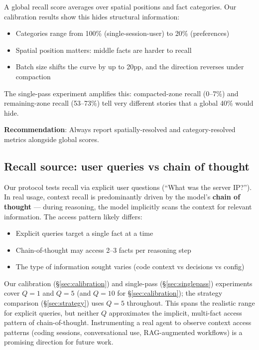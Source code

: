 A global recall score averages over spatial positions and fact categories. Our
calibration results show this hides structural information:
\begin{itemize}
  \item Categories range from 100\% (single-session-user) to 20\% (preferences)
  \item Spatial position matters: middle facts are harder to recall
  \item Batch size shifts the curve by up to 20pp, and the direction reverses under compaction
\end{itemize}

The single-pass experiment amplifies this: compacted-zone recall (0--7\%) and remaining-zone recall
(53--73\%) tell very different stories that a global 40\% would hide.

\textbf{Recommendation}: Always report spatially-resolved and category-resolved
metrics alongside global scores.

\subsection{Recall source: user queries vs chain of thought}
\label{sec:cot}

Our protocol tests recall via explicit user questions (``What was the server
IP?''). In real usage, context recall is predominantly driven by the model's
\textbf{chain of thought} --- during reasoning, the model implicitly scans the
context for relevant information. The access pattern likely differs:
\begin{itemize}
  \item Explicit queries target a single fact at a time
  \item Chain-of-thought may access 2--3 facts per reasoning step
  \item The type of information sought varies (code context vs decisions vs config)
\end{itemize}

Our calibration (\S\ref{sec:calibration}) and single-pass (\S\ref{sec:singlepass}) experiments cover $Q=1$ and $Q=5$
(and $Q=10$ for \S\ref{sec:calibration}); the strategy comparison (\S\ref{sec:strategy}) uses $Q=5$ throughout. This
spans the realistic range for explicit queries, but neither $Q$ approximates
the implicit, multi-fact access pattern of chain-of-thought. Instrumenting
a real agent to observe context access patterns (coding sessions,
conversational use, RAG-augmented workflows) is a promising direction for
future work.

